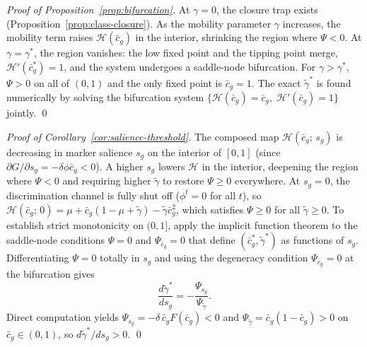 \documentclass[pdflatex,sn-basic]{sn-jnl}
\theoremstyle{thmstyleone}
\numberwithin{proposition}{subsection}
\begin{document}
\begin{proof}[Proof of Proposition~\ref{prop:bifurcation}]
At $\gamma = 0$, the closure trap exists
(Proposition~\ref{prop:class-closure}). As the mobility parameter $\gamma$ increases, the
mobility term raises $\mathcal{H}(\bar{c}_g)$ in the interior, shrinking
the region where $\Psi < 0$. At $\gamma = \gamma^*$, the region
vanishes: the low fixed point and the tipping point merge,
$\mathcal{H}'(\bar{c}_g^*) = 1$, and the system undergoes a saddle-node
bifurcation. For $\gamma > \gamma^*$, $\Psi > 0$ on all of $(0,1)$
and the only fixed point is $\bar{c}_g = 1$. The exact $\tilde{\gamma}^*$ is
found numerically by solving the bifurcation system
$\{\mathcal{H}(\bar{c}_g) = \bar{c}_g,\; \mathcal{H}'(\bar{c}_g) = 1\}$ jointly.
\qed
\end{proof}

\begin{proof}[Proof of Corollary~\ref{cor:salience-threshold}]
The composed map $\mathcal{H}(\bar{c}_g;\, s_g)$ is decreasing in marker salience $s_g$ on the
interior of $[0,1]$ (since $\partial G/\partial s_g = -\delta\phi
\bar{c}_g < 0$). A higher $s_g$ lowers $\mathcal{H}$ in the interior, deepening
the region where $\Psi < 0$ and requiring higher $\tilde{\gamma}$ to
restore $\Psi \geq 0$ everywhere. At $s_g = 0$, the discrimination
channel is fully shut off ($\phi^t = 0$ for all $t$), so
$\mathcal{H}(\bar{c}_g;\, 0) = \mu + \bar{c}_g(1 - \mu + \tilde{\gamma}) -
\tilde{\gamma}\bar{c}_g^2$, which satisfies $\Psi \geq 0$ for all
$\tilde{\gamma} \geq 0$. To establish strict monotonicity on
$(0,1]$, apply the implicit function theorem to the saddle-node
conditions $\Psi = 0$ and $\Psi_{\bar{c}_g} = 0$ that define
$(\bar{c}_g^*, \tilde{\gamma}^*)$ as functions of $s_g$.
Differentiating $\Psi = 0$ totally in $s_g$ and using the degeneracy
condition $\Psi_{\bar{c}_g} = 0$ at the bifurcation gives
\[
\frac{d\tilde{\gamma}^*}{ds_g} = -\frac{\Psi_{s_g}}{\Psi_{\tilde{\gamma}}}.
\]
Direct computation yields
$\Psi_{s_g} = -\delta\,\bar{c}_g F(\bar{c}_g) < 0$ and
$\Psi_{\tilde{\gamma}} = \bar{c}_g(1 - \bar{c}_g) > 0$ on $\bar{c}_g \in
(0,1)$, so $d\tilde{\gamma}^*/ds_g > 0$. \qed
\end{proof}
\end{document}
